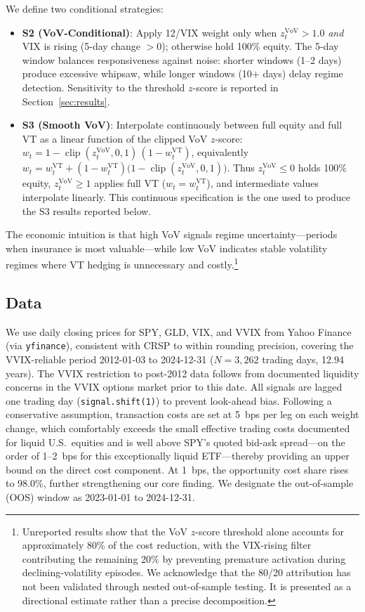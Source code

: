 \documentclass[12pt,a4paper]{article}
\begin{document}
We define two conditional strategies:
\begin{itemize}
\item \textbf{S2 (VoV-Conditional)}: Apply 12/VIX weight only when $z_t^{\text{VoV}} > 1.0$ \emph{and} VIX is rising (5-day change $ > 0$); otherwise hold 100\% equity. The 5-day window balances responsiveness against noise: shorter windows (1--2 days) produce excessive whipsaw, while longer windows (10+ days) delay regime detection. Sensitivity to the threshold $z$-score is reported in Section~\ref{sec:results}.
\item \textbf{S3 (Smooth VoV)}: Interpolate continuously between full equity and full VT as a linear function of the clipped VoV $z$-score: $w_t = 1 - \operatorname{clip}(z_t^{\text{VoV}}, 0, 1)\,(1 - w_t^{\text{VT}})$, equivalently $w_t = w_t^{\text{VT}} + (1 - w_t^{\text{VT}})\bigl(1 - \operatorname{clip}(z_t^{\text{VoV}}, 0, 1)\bigr)$. Thus $z_t^{\text{VoV}} \le 0$ holds 100\% equity, $z_t^{\text{VoV}} \ge 1$ applies full VT ($w_t = w_t^{\text{VT}}$), and intermediate values interpolate linearly. This continuous specification is the one used to produce the S3 results reported below.
\end{itemize}

The economic intuition is that high VoV signals regime uncertainty---periods when insurance is most valuable---while low VoV indicates stable volatility regimes where VT hedging is unnecessary and costly.\footnote{Unreported results show that the VoV $z$-score threshold alone accounts for approximately 80\% of the cost reduction, with the VIX-rising filter contributing the remaining 20\% by preventing premature activation during declining-volatility episodes. We acknowledge that the 80/20 attribution has not been validated through nested out-of-sample testing. It is presented as a directional estimate rather than a precise decomposition.}

\subsection{Data}

We use daily closing prices for SPY, GLD, VIX, and VVIX from Yahoo Finance (via \texttt{yfinance}), consistent with CRSP to within rounding precision, covering the VVIX-reliable period 2012-01-03 to 2024-12-31 ($N = 3{,}262$ trading days, 12.94 years). The VVIX restriction to post-2012 data follows from documented liquidity concerns in the VVIX options market prior to this date. All signals are lagged one trading day (\texttt{signal.shift(1)}) to prevent look-ahead bias. Following a conservative assumption, transaction costs are set at 5~bps per leg on each weight change, which comfortably exceeds the small effective trading costs documented for liquid U.S.\ equities \citep{hasbrouck2009} and is well above SPY's quoted bid-ask spread---on the order of 1--2~bps for this exceptionally liquid ETF---thereby providing an upper bound on the direct cost component. At 1~bps, the opportunity cost share rises to 98.0\%, further strengthening our core finding. We designate the out-of-sample (OOS) window as 2023-01-01 to 2024-12-31.
\end{document}
